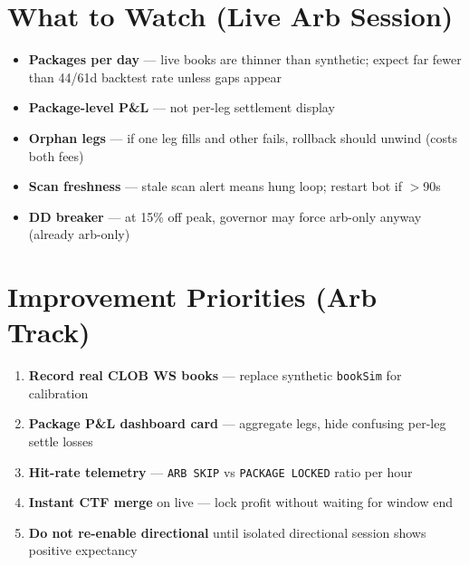 \documentclass[11pt,a4paper]{article}
\begin{document}
\section{What to Watch (Live Arb Session)}

\begin{itemize}
  \item \textbf{Packages per day} --- live books are thinner than synthetic; expect far fewer than 44/61d backtest rate unless gaps appear
  \item \textbf{Package-level P\&L} --- not per-leg settlement display
  \item \textbf{Orphan legs} --- if one leg fills and other fails, rollback should unwind (costs both fees)
  \item \textbf{Scan freshness} --- stale scan alert means hung loop; restart bot if $>$90s
  \item \textbf{DD breaker} --- at 15\% off peak, governor may force arb-only anyway (already arb-only)
\end{itemize}

\section{Improvement Priorities (Arb Track)}

\begin{enumerate}
  \item \textbf{Record real CLOB WS books} --- replace synthetic \texttt{bookSim} for calibration
  \item \textbf{Package P\&L dashboard card} --- aggregate legs, hide confusing per-leg settle losses
  \item \textbf{Hit-rate telemetry} --- \texttt{ARB SKIP} vs \texttt{PACKAGE LOCKED} ratio per hour
  \item \textbf{Instant CTF merge} on live --- lock profit without waiting for window end
  \item \textbf{Do not re-enable directional} until isolated directional session shows positive expectancy
\end{enumerate}

\end{document}
